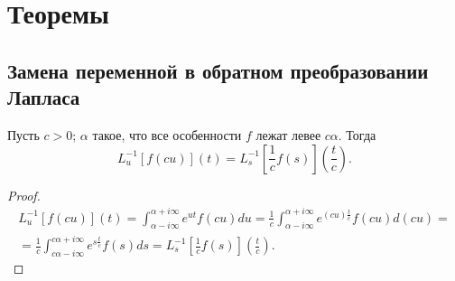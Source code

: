 \chapter{Теоремы}

%
\section{Замена переменной в обратном преобразовании Лапласа}
\begin{Th*}
Пусть $c>0$; $\alpha$ такое, что все особенности $f$ лежат левее $c\alpha$. Тогда
\[
    L^{-1}_u \left[ f(cu) \right](t) = L^{-1}_s \left[ \frac{1}{c}f(s) \right]\left(\frac{t}{c}\right)
.\]
\end{Th*}
\begin{proof}
\begin{multline*}
    L^{-1}_u\left[f\left(cu\right)\right](t) 
    = \int_{\alpha-i\infty}^{\alpha+i\infty} e^{ut}f(cu)du 
    = \frac{1}{c} \int_{\alpha-i\infty}^{\alpha+i\infty} e^{\left(cu\right) \frac{t}{c}} f(cu) d\left(cu\right)
=\\=
    \frac{1}{c} \int_{c\alpha-i\infty}^{c\alpha+i\infty} e^{s\frac{t}{c}} f(s) ds
    = L^{-1}_s \left[ \frac{1}{c} f(s) \right]\left( \frac{t}{c} \right)  
.\end{multline*}
\end{proof}
%





